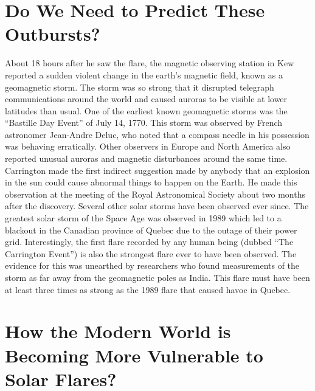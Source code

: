 \documentclass{../template/texnote}
\begin{document}
\section{Do We Need to Predict These Outbursts?}
About 18 hours after he saw the flare, the magnetic observing station in Kew reported a sudden violent change in the earth’s magnetic field, known as a geomagnetic storm. The storm was so strong that it disrupted telegraph communications around the world and caused auroras to be visible at lower latitudes than usual.
One of the earliest known geomagnetic storms was the ``Bastille Day Event'' of July 14, 1770. This storm was observed by French astronomer Jean-Andre Deluc, who noted that a compass needle in his possession was behaving erratically. Other observers in Europe and North America also reported unusual auroras and magnetic disturbances around the same time.
Carrington made the first indirect suggestion made by anybody that an explosion in the sun could cause abnormal things to happen on the Earth. He made this observation at the meeting of the Royal Astronomical Society about two months after the discovery. 
Several other solar storms have been observed ever since. The greatest solar storm of the Space Age was observed in 1989 which led to a blackout in the Canadian province of Quebec due to the outage of their power grid. Interestingly, the first flare recorded by any human being (dubbed ``The Carrington Event'') is also the strongest flare ever to have been observed.
The evidence for this was unearthed by researchers who found measurements of the storm as far away from the geomagnetic poles as India. This flare must have been at least three times as strong as the 1989 flare that caused havoc in Quebec. 
\section{How the Modern World is Becoming More Vulnerable to Solar Flares?}
\end{document}
